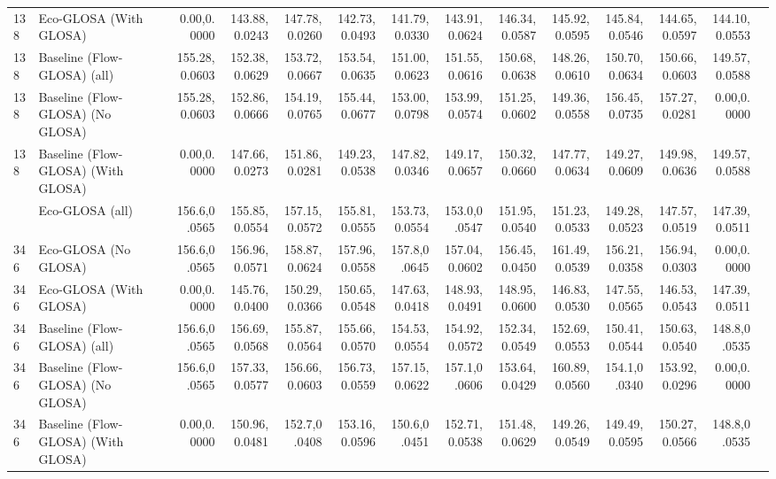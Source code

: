 \begin{table}[ht]
{\begin{tabular}{llrrrrrrrrrrrr}
      138  & Eco-GLOSA (With GLOSA)             &   0.00,0.0000 & 143.88,0.0243 & 147.78,0.0260 & 142.73,0.0493 & 141.79,0.0330 & 143.91,0.0624 & 146.34,0.0587 & 145.92,0.0595 & 145.84,0.0546 & 144.65,0.0597 & 144.10,0.0553 \\
      138  & Baseline (Flow-GLOSA) (all)        & 155.28,0.0603 & 152.38,0.0629 & 153.72,0.0667 & 153.54,0.0635 & 151.00,0.0623 & 151.55,0.0616 & 150.68,0.0638 & 148.26,0.0610 & 150.70,0.0634 & 150.66,0.0603 & 149.57,0.0588 \\
      138  & Baseline (Flow-GLOSA) (No GLOSA)   & 155.28,0.0603 & 152.86,0.0666 & 154.19,0.0765 & 155.44,0.0677 & 153.00,0.0798 & 153.99,0.0574 & 151.25,0.0602 & 149.36,0.0558 & 156.45,0.0735 & 157.27,0.0281 &   0.00,0.0000 \\
      138  & Baseline (Flow-GLOSA) (With GLOSA) &   0.00,0.0000 & 147.66,0.0273 & 151.86,0.0281 & 149.23,0.0538 & 147.82,0.0346 & 149.17,0.0657 & 150.32,0.0660 & 147.77,0.0634 & 149.27,0.0609 & 149.98,0.0636 & 149.57,0.0588 \\
      \addlinespace
      346  & Eco-GLOSA (all)                    & 156.6,0.0565   & 155.85,0.0554 & 157.15,0.0572 & 155.81,0.0555 & 153.73,0.0554 & 153.0,0.0547  & 151.95,0.0540 & 151.23,0.0533 & 149.28,0.0523 & 147.57,0.0519 & 147.39,0.0511 \\
      346  & Eco-GLOSA (No GLOSA)               & 156.6,0.0565   & 156.96,0.0571 & 158.87,0.0624 & 157.96,0.0558 & 157.8,0.0645  & 157.04,0.0602 & 156.45,0.0450 & 161.49,0.0539 & 156.21,0.0358 & 156.94,0.0303 &   0.00,0.0000 \\
      346  & Eco-GLOSA (With GLOSA)             &   0.00,0.0000  & 145.76,0.0400 & 150.29,0.0366 & 150.65,0.0548 & 147.63,0.0418 & 148.93,0.0491 & 148.95,0.0600 & 146.83,0.0530 & 147.55,0.0565 & 146.53,0.0543 & 147.39,0.0511 \\
      346  & Baseline (Flow-GLOSA) (all)        & 156.6,0.0565   & 156.69,0.0568 & 155.87,0.0564 & 155.66,0.0570 & 154.53,0.0554 & 154.92,0.0572 & 152.34,0.0549 & 152.69,0.0553 & 150.41,0.0544 & 150.63,0.0540 & 148.8,0.0535  \\
      346  & Baseline (Flow-GLOSA) (No GLOSA)   & 156.6,0.0565   & 157.33,0.0577 & 156.66,0.0603 & 156.73,0.0559 & 157.15,0.0622 & 157.1,0.0606  & 153.64,0.0429 & 160.89,0.0560 & 154.1,0.0340  & 153.92,0.0296 &   0.00,0.0000 \\
      346  & Baseline (Flow-GLOSA) (With GLOSA) &   0.00,0.0000  & 150.96,0.0481 & 152.7,0.0408  & 153.16,0.0596 & 150.6,0.0451  & 152.71,0.0538 & 151.48,0.0629 & 149.26,0.0549 & 149.49,0.0595 & 150.27,0.0566 & 148.8,0.0535  \\

\end{tabular}}
\end{table}
